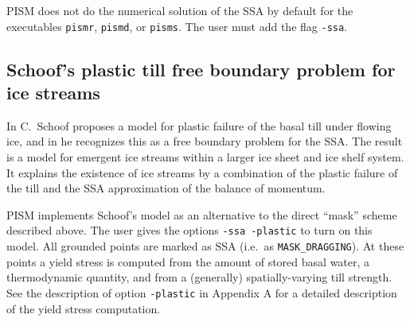 \documentclass[11pt,final]{amsart}
\begin{document}
PISM does not do the numerical solution of the SSA by default for the executables \verb|pismr|, \verb|pismd|, or \verb|pisms|.  The user must add the flag \verb|-ssa|.


\subsection{Schoof's plastic till free boundary problem for ice streams} \label{subsect:plastic}    In \cite{SchoofTill} C.~Schoof proposes a model for plastic failure of the basal till under flowing ice, and in \cite{SchoofStream} he recognizes this as a free boundary problem for the SSA.  The result is a model for emergent ice streams within a larger ice sheet and ice shelf system.  It explains the existence of ice streams by a combination of the plastic failure of the till and the SSA approximation of the balance of momentum.

PISM implements Schoof's model as an alternative to the direct ``mask'' scheme described above.  The user gives the options \verb|-ssa -plastic| to turn on this model.  All grounded points are marked as SSA (i.e.~as \verb|MASK_DRAGGING|).  At these points a yield stress is computed from the amount of stored basal water, a thermodynamic quantity, and from a (generally) spatially-varying till strength.  See the description of option \verb|-plastic| in Appendix A for a detailed description of the yield stress computation.
\end{document}
